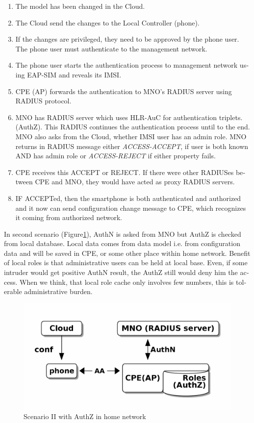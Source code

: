 \documentclass[12pt,a4paper,english]{tutthesis}
\begin{document}
\begin{otherlanguage}{english}
\begin{enumerate}
\item The model has been changed in the Cloud.
\item The Cloud send the changes to the Local Controller (phone).
\item If the changes are privileged, they need to be approved by the phone user.
The phone user must  authenticate to the management network.
\item The phone user starts the authentication process to management
network using EAP-SIM and reveals its IMSI.
\item CPE (AP) forwards the authentication to MNO's RADIUS server using
RADIUS protocol.
\item MNO has RADIUS server which uses HLR-AuC for authentication
  triplets. 
  (AuthZ). This RADIUS continues the authentication process until to
  the end. 
MNO also asks from the Cloud, whether IMSI user has an admin role.
MNO returns in RADIUS message either \emph{ACCESS-ACCEPT}, if user is both
  known AND has admin role  or \emph{ACCESS-REJECT} if either property
  fails.
\item CPE receives this ACCEPT or REJECT. If there were other RADIUSes
between CPE and MNO, they would have acted
as proxy RADIUS servers.
\item IF ACCEPTed, then the smartphone is both authenticated and
authorized and it now 
can send configuration change message to CPE, which recognizes it
coming from authorized  network.
\end{enumerate}






\label{scenario-ii}

In second scenario (Figure\ref{fig:scenario-II}), AuthN is asked from MNO but
AuthZ is checked from local database. Local data comes from data model
i.e. from configuration data and will be saved in CPE, or some other
place within home network. Benefit of local roles is that
administrative users can be held at local base. Even, if some intruder
would get positive AuthN result, the AuthZ still would deny him the access.
When we think, that local role cache only involves few numbers, this
is tolerable administrative burden.


\begin{figure}[htb]
\centering
\includegraphics[width=.9\linewidth]{scenII.png}
\caption{\label{fig:scenario-II}Scenario II with AuthZ in home network}
\end{figure}



\end{otherlanguage}
\end{document}
